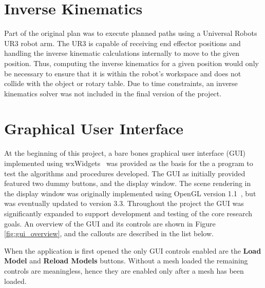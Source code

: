 \section{Inverse Kinematics}
Part of the original plan was to execute planned paths using a Universal Robots UR3 robot arm.
The UR3 is capable of receiving end effector positions and handling the inverse kinematic calculations internally to move to the given position.
Thus, computing the inverse kinematics for a given position would only be necessary to ensure that it is within the robot's workspace and does not collide with the object or rotary table.
Due to time constraints, an inverse kinematics solver was not included in the final version of the project.


\section{Graphical User Interface}
At the beginning of this project, a bare bones graphical user interface (GUI) implemented using wxWidgets~\cite{wxWidgets} was provided as the basis for the a program to test the algorithms and procedures developed.
The GUI as initially provided featured two dummy buttons, and the display window.
The scene rendering in the display window was originally implemented using OpenGL version 1.1~\cite{OpenGL_wiki}, but was eventually updated to version 3.3.
Throughout the project the GUI was significantly expanded to support development and testing of the core research goals.
An overview of the GUI and its controls are shown in Figure \ref{fig:gui_overview}, and the callouts are described in the list below.

When the application is first opened the only GUI controls enabled are the \textbf{Load Model} and \textbf{Reload Models} buttons.
Without a mesh loaded the remaining controls are meaningless, hence they are enabled only after a mesh has been loaded.

